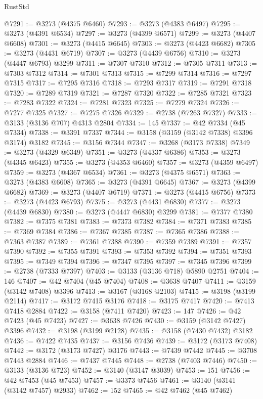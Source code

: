 \begin{lexlean}{RustStd}
\begin{coremodule}
@7291 := @3273 (@4375 @6460)
@7293 := @3273 (@4383 @6497)
@7295 := @3273 (@4391 @6534)
@7297 := @3273 (@4399 @6571)
@7299 := @3273 (@4407 @6608)
@7301 := @3273 (@4415 @6645)
@7303 := @3273 (@4423 @6682)
@7305 := @3273 (@4431 @6719)
@7307 := @3273 (@4439 @6756)
@7310 := @3273 (@4447 @6793) @3299
@7311 := @7307 @7310
@7312 := @7305 @7311
@7313 := @7303 @7312
@7314 := @7301 @7313
@7315 := @7299 @7314
@7316 := @7297 @7315
@7317 := @7295 @7316
@7318 := @7293 @7317
@7319 := @7291 @7318
@7320 := @7289 @7319
@7321 := @7287 @7320
@7322 := @7285 @7321
@7323 := @7283 @7322
@7324 := @7281 @7323
@7325 := @7279 @7324
@7326 := @7277 @7325
@7327 := @7275 @7326
@7329 := @2738 (@7263 @7327)
@7333 := @3133 (@3136 @707) @4313 @2804
@7334 := 145
@7337 := @42 @7334 (@45 @7334)
@7338 := @3391 @7337
@7344 := @3158 (@3159 (@3142 @7338) @3396 @3174) @3182
@7345 := @3156 @7344
@7347 := @3268 (@3173 @7338)
@7349 := @3273 (@4329 @6349)
@7351 := @3273 (@4337 @6386)
@7353 := @3273 (@4345 @6423)
@7355 := @3273 (@4353 @6460)
@7357 := @3273 (@4359 @6497)
@7359 := @3273 (@4367 @6534)
@7361 := @3273 (@4375 @6571)
@7363 := @3273 (@4383 @6608)
@7365 := @3273 (@4391 @6645)
@7367 := @3273 (@4399 @6682)
@7369 := @3273 (@4407 @6719)
@7371 := @3273 (@4415 @6756)
@7373 := @3273 (@4423 @6793)
@7375 := @3273 (@4431 @6830)
@7377 := @3273 (@4439 @6830)
@7380 := @3273 (@4447 @6830) @3299
@7381 := @7377 @7380
@7382 := @7375 @7381
@7383 := @7373 @7382
@7384 := @7371 @7383
@7385 := @7369 @7384
@7386 := @7367 @7385
@7387 := @7365 @7386
@7388 := @7363 @7387
@7389 := @7361 @7388
@7390 := @7359 @7389
@7391 := @7357 @7390
@7392 := @7355 @7391
@7393 := @7353 @7392
@7394 := @7351 @7393
@7395 := @7349 @7394
@7396 := @7347 @7395
@7397 := @7345 @7396
@7399 := @2738 (@7333 @7397)
@7403 := @3133 (@3136 @718) @5890 @2751
@7404 := 146
@7407 := @42 @7404 (@45 @7404)
@7408 := @3638 @7407
@7411 := @3159 (@3142 @7408) @3396
@7413 := @3167 (@3168 @2103)
@7415 := @3198 (@3199 @2114)
@7417 := @3172 @7415 @3176
@7418 := @3175 @7417
@7420 := @7413 @7418 @2884
@7422 := @3158 (@7411 @7420)
@7423 := 147
@7426 := @42 @7423 (@45 @7423)
@7427 := @3638 @7426
@7430 := @3159 (@3142 @7427) @3396
@7432 := @3198 (@3199 @2128)
@7435 := @3158 (@7430 @7432) @3182
@7436 := @7422 @7435
@7437 := @3156 @7436
@7439 := @3172 (@3173 @7408)
@7442 := @3172 (@3173 @7427) @3176
@7443 := @7439 @7442
@7445 := @3708 @7443 @2884
@7446 := @7437 @7445
@7448 := @2738 (@7403 @7446)
@7450 := @3133 (@3136 @723)
@7452 := @3140 (@3147 @3039)
@7453 := 151
@7456 := @42 @7453 (@45 @7453)
@7457 := @3373 @7456
@7461 := @3140 (@3141 (@3142 @7457) @2933)
@7462 := 152
@7465 := @42 @7462 (@45 @7462)

\end{coremodule}
\end{lexlean}

